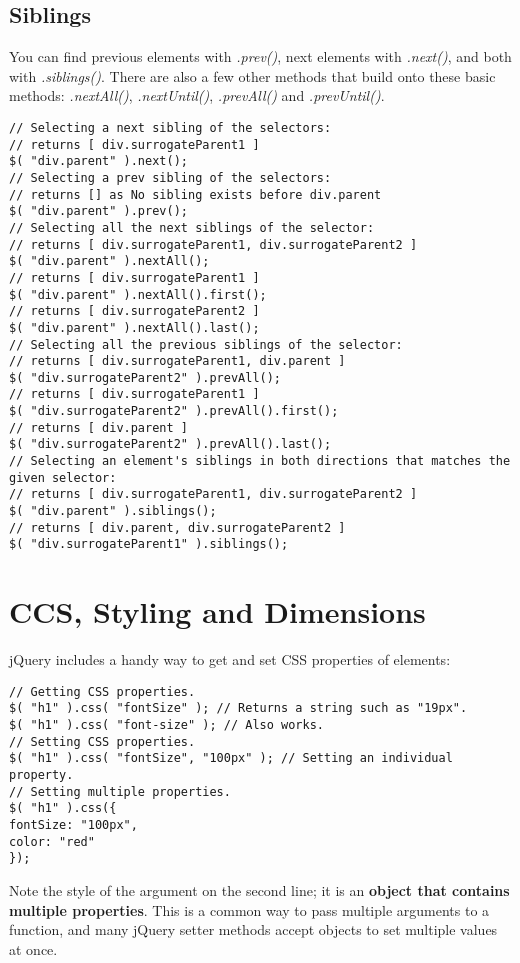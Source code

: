 \documentclass[10pt,letterpaper]{report}
\begin{document}
\subsection{Siblings}
You can find previous elements with \textit{.prev()}, next elements with \textit{.next()}, and both with \textit{.siblings()}. There are also a few other methods that build onto these basic methods: \textit{.nextAll()}, \textit{.nextUntil()}, \textit{.prevAll()} and \textit{.prevUntil()}.
\begin{lstlisting}
// Selecting a next sibling of the selectors:
// returns [ div.surrogateParent1 ]
$( "div.parent" ).next();
// Selecting a prev sibling of the selectors:
// returns [] as No sibling exists before div.parent
$( "div.parent" ).prev();
// Selecting all the next siblings of the selector:
// returns [ div.surrogateParent1, div.surrogateParent2 ]
$( "div.parent" ).nextAll();
// returns [ div.surrogateParent1 ]
$( "div.parent" ).nextAll().first();
// returns [ div.surrogateParent2 ]
$( "div.parent" ).nextAll().last();
// Selecting all the previous siblings of the selector:
// returns [ div.surrogateParent1, div.parent ]
$( "div.surrogateParent2" ).prevAll();
// returns [ div.surrogateParent1 ]
$( "div.surrogateParent2" ).prevAll().first();
// returns [ div.parent ]
$( "div.surrogateParent2" ).prevAll().last();
// Selecting an element's siblings in both directions that matches the given selector:
// returns [ div.surrogateParent1, div.surrogateParent2 ]
$( "div.parent" ).siblings();
// returns [ div.parent, div.surrogateParent2 ]
$( "div.surrogateParent1" ).siblings();
\end{lstlisting}
\section{CCS, Styling and Dimensions}
jQuery includes a handy way to get and set CSS properties of elements:
\begin{lstlisting}
// Getting CSS properties.
$( "h1" ).css( "fontSize" ); // Returns a string such as "19px".
$( "h1" ).css( "font-size" ); // Also works.
// Setting CSS properties.
$( "h1" ).css( "fontSize", "100px" ); // Setting an individual property.
// Setting multiple properties.
$( "h1" ).css({
fontSize: "100px",
color: "red"
});
\end{lstlisting}
Note the style of the argument on the second line; it is an \textbf{object that contains multiple properties}. This is a common way to pass multiple arguments to a function, and many jQuery setter methods accept objects to set multiple values at once.
\end{document}
